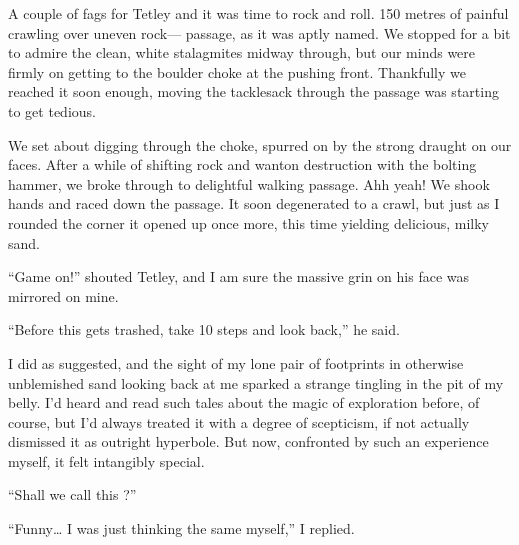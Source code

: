 A couple of fags for Tetley and it was time to rock and roll. 150 metres
of painful crawling over uneven rock--- passage, as it
was aptly named. We stopped for a bit to admire the clean, white
stalagmites midway through, but our minds were firmly on getting to the
boulder choke at the pushing front. Thankfully we reached it soon
enough, moving the tacklesack through the passage was starting to get
tedious.

We set about digging through the choke, spurred on by the strong draught
on our faces. After a while of shifting rock and wanton destruction with
the bolting hammer, we broke through to delightful walking passage. Ahh
yeah! We shook hands and raced down the passage. It soon degenerated to
a crawl, but just as I rounded the corner it opened up once more, this
time yielding delicious, milky sand.

``Game on!'' shouted Tetley, and I am sure the massive grin on his face
was mirrored on mine.

``Before this gets trashed, take 10 steps and look back,'' he said.


I did as suggested, and the sight of my lone pair of footprints in
otherwise unblemished sand looking back at me sparked a strange tingling
in the pit of my belly. I'd heard and read such tales about the magic of
exploration before, of course, but I'd always treated it with a degree
of scepticism, if not actually dismissed it as outright hyperbole. But
now, confronted by such an experience myself, it felt intangibly
special.

``Shall we call this ?''

``Funny\ldots{} I was just thinking the same myself,'' I replied.

